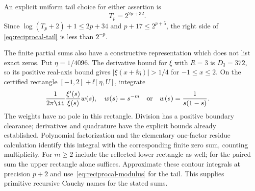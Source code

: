 An explicit uniform tail choice for either assertion is
\begin{equation}
                         T_p=2^{2p+32}.
 \label{eq:reciprocal-modulus}
\end{equation}
Since $\log(T_p+2)+1\le2p+34$ and
$p+17\le2^{p+5}$, the right side of
\eqref{eq:reciprocal-tail} is less than $2^{-p}$.

The finite partial sums also have a constructive representation which
does not list exact zeros. Put $\eta=1/4096$. The derivative bound for
$\xi$ with $R=3$ is $D_3=372$, so its positive real-axis bound gives
$|\xi(x+\ii\eta)|>1/4$ for $-1\le x\le2$.
On the certified rectangle $[-1,2]+\ii[\eta,U]$, integrate
\[
 \frac{1}{2\pi\ii}\frac{\xi'(s)}{\xi(s)}w(s),
 \quad w(s)=s^{-m}\quad\hbox{or}\quad w(s)=\frac1{s(1-s)}.
\]
The weights have no pole in this rectangle. Division has a positive
boundary clearance; derivatives and quadrature have the explicit bounds
already established. Polynomial factorization and the elementary
one-factor residue calculation identify this integral with the
corresponding finite zero sum, counting multiplicity. For $m\ge2$
include the reflected lower rectangle as well; for the paired sum the
upper rectangle alone suffices. Approximate these contour integrals at
precision $p+2$ and use~\eqref{eq:reciprocal-modulus} for the tail.
This supplies primitive recursive Cauchy names for the stated sums.
